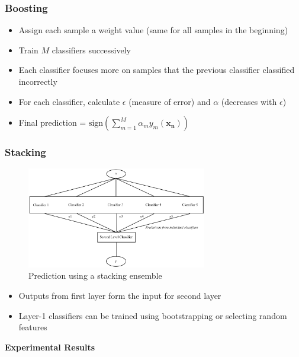 \documentclass{beamer}
\begin{document}
    \begin{frame}
        \frametitle{Boosting}
        \begin{itemize}
            \item{Assign each sample a weight value (same for all samples in the beginning)}
            \item{Train $M$ classifiers successively}
            \item{Each classifier focuses more on samples that the previous classifier classified incorrectly}
            \item{For each classifier, calculate $\epsilon$ (measure of error) and $\alpha$ (decreases with $\epsilon$)}
            \item{Final prediction = $\mathrm{sign}(\displaystyle \sum_{m = 1}^{M} \alpha_m y_m(\mathbf{x_n}))$}
        \end{itemize}
    \end{frame}
    
    \begin{frame}
        \frametitle{Stacking}
        \begin{figure}
            \centering
            \includegraphics[width=0.7\textwidth]{figures/stacking_prediction_flow.png}
            \caption{Prediction using a stacking ensemble}
        \end{figure}
        \begin{itemize}
            \item{Outputs from first layer form the input for second layer}
            \item{Layer-1 classifiers can be trained using bootstrapping or selecting random features}
        \end{itemize}
    \end{frame}
    
    \begin{frame}
        \begin{center}
            \textbf{Experimental Results}
        \end{center}
    \end{frame}
    
\end{document}
